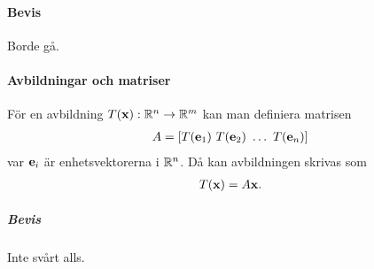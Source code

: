 \paragraph{Bevis}
Borde gå.

\paragraph{Avbildningar och matriser}
För en avbildning $T(\vect{x}): \R^n\to\R^m$ kan man definiera matrisen
\begin{align*}
	A = \left[ T(\vect{e}_1) ~ T(\vect{e}_2) ~ \dots ~ T(\vect{e}_n) \right]
\end{align*}
var $\vect{e}_i$ är enhetsvektorerna i $\mathbb{R}^n$. Då kan avbildningen skrivas som
\begin{align*}
	T(\vect{x}) = A\vect{x}.
\end{align*}

\subparagraph{Bevis}
Inte svårt alls.